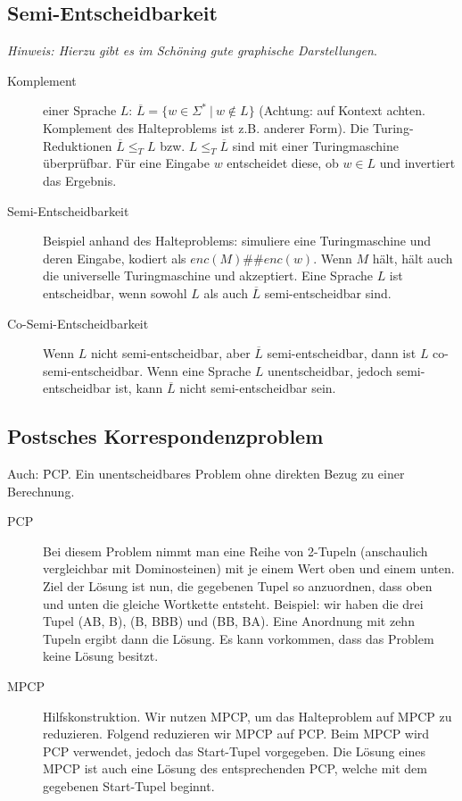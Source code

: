 \newpage
\subsection{Semi-Entscheidbarkeit}
    \textit{Hinweis: Hierzu gibt es im Schöning gute graphische Darstellungen}. 
    \begin{description}
        \item[Komplement] einer Sprache $L$: $\overline{L} = \{w \in \Sigma^* ~|~ w \notin L \}$ (Achtung: auf Kontext achten. Komplement des Halteproblems ist z.B. anderer Form). Die Turing-Reduktionen $\overline{L} \leq_T L$ bzw. $L \leq_T \overline{L}$ sind mit einer Turingmaschine überprüfbar. Für eine Eingabe $w$ entscheidet diese, ob $w \in L$ und invertiert das Ergebnis.
        \item[Semi-Entscheidbarkeit] Beispiel anhand des Halteproblems: simuliere eine Turingmaschine und deren Eingabe, kodiert als $enc(M)\#\#enc(w)$. Wenn $M$ hält, hält auch die universelle Turingmaschine und akzeptiert. Eine Sprache $L$ ist entscheidbar, wenn sowohl $L$ als auch $\overline{L}$ semi-entscheidbar sind.
        \item[Co-Semi-Entscheidbarkeit] Wenn $L$ nicht semi-entscheidbar, aber $\overline{L}$ semi-entscheidbar, dann ist $L$ co-semi-entscheidbar. Wenn eine Sprache $L$ unentscheidbar, jedoch semi-entscheidbar ist, kann $\overline{L}$ nicht semi-entscheidbar sein.
    \end{description}


\subsection{Postsches Korrespondenzproblem}
    Auch: \f{PCP}. Ein unentscheidbares Problem ohne direkten Bezug zu einer Berechnung. 
    \begin{description}
        \item[PCP] Bei diesem Problem nimmt man eine Reihe von 2-Tupeln (anschaulich vergleichbar mit Dominosteinen) mit je einem Wert oben und einem unten. Ziel der Lösung ist nun, die gegebenen Tupel so anzuordnen, dass oben und unten die gleiche Wortkette entsteht. Beispiel: wir haben die drei Tupel (AB, B), (B, BBB) und (BB, BA). Eine Anordnung mit zehn Tupeln ergibt dann die Lösung. Es kann vorkommen, dass das Problem keine Lösung besitzt.
        \item[MPCP] Hilfskonstruktion. Wir nutzen MPCP, um das Halteproblem auf MPCP zu reduzieren. Folgend reduzieren wir MPCP auf PCP. Beim MPCP wird PCP verwendet, jedoch das Start-Tupel vorgegeben. Die Lösung eines MPCP ist auch eine Lösung des entsprechenden PCP, welche mit dem gegebenen Start-Tupel beginnt.
    \end{description}


